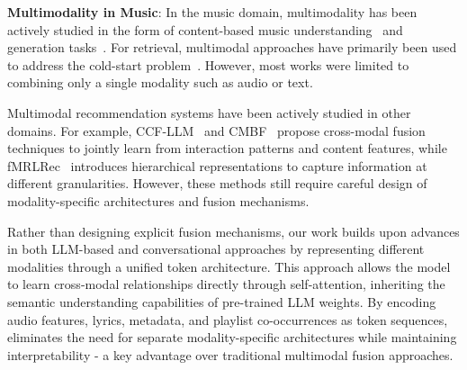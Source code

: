 \textbf{Multimodality in Music}:
In the music domain, multimodality has been actively studied in the form of content-based music understanding~\cite{gardner2023llark, mugen} and generation tasks~\cite{tal2024joint}. For retrieval, multimodal approaches have primarily been used to address the cold-start problem~\cite{van2013deep, oramas2017deep}. However, most works were limited to combining only a single modality such as audio or text. 


Multimodal recommendation systems have been actively studied in other domains. For example,
CCF-LLM~\cite{liu2024collaborative} and CMBF~\cite{chen2021cmbf} propose cross-modal fusion techniques to jointly learn from interaction patterns and content features, while fMRLRec~\cite{lai2024matryoshka} introduces hierarchical representations to capture information at different granularities. However, these methods still require careful design of modality-specific architectures and fusion mechanisms.



Rather than designing explicit fusion mechanisms, our work builds upon advances in both LLM-based and conversational approaches by representing different modalities through a unified token architecture. This approach allows the model to learn cross-modal relationships directly through self-attention, inheriting the semantic understanding capabilities of pre-trained LLM weights. By encoding audio features, lyrics, metadata, and playlist co-occurrences as token sequences, \modelname eliminates the need for separate modality-specific architectures while maintaining interpretability - a key advantage over traditional multimodal fusion approaches.